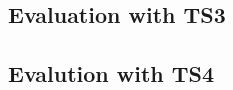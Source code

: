 \subsection{Evaluation with TS3}
\label{sec:mlp-disc-ts3}



\subsection{Evalution with TS4}
\label{sec:mlp-disc-ts4}




